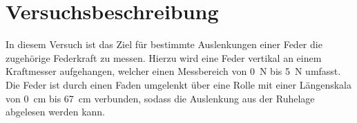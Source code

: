 \section{Versuchsbeschreibung}
\label{sec:Versuchsbeschreibung}

In diesem Versuch ist das Ziel für bestimmte Auslenkungen einer Feder die zugehörige Federkraft zu messen.
Hierzu wird eine Feder vertikal an einem Kraftmesser aufgehangen, welcher einen Messbereich von \SI{0}{\newton} bis \SI{5}{\newton} umfasst. 
Die Feder ist durch einen Faden umgelenkt über eine Rolle mit einer Längenskala von \SI{0}{\centi\meter} bis \SI{67}{\centi\meter} verbunden, sodass die Auslenkung aus der Ruhelage abgelesen werden kann.
\cite{V803}